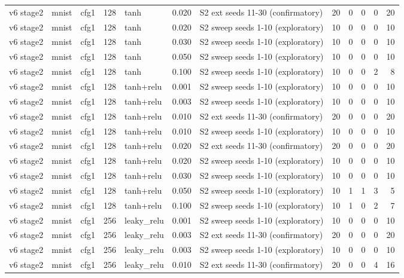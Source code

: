 \begin{table}[htbp]
{\begin{tabular}{@{}lllrlrlrrrrr@{}}
v6 stage2 & mnist & cfg1 & 128 & tanh & 0.020 & S2 ext seeds 11-30 (confirmatory) & 20 & 0 & 0 & 0 & 20 \\
v6 stage2 & mnist & cfg1 & 128 & tanh & 0.020 & S2 sweep seeds 1-10 (exploratory) & 10 & 0 & 0 & 0 & 10 \\
v6 stage2 & mnist & cfg1 & 128 & tanh & 0.030 & S2 sweep seeds 1-10 (exploratory) & 10 & 0 & 0 & 0 & 10 \\
v6 stage2 & mnist & cfg1 & 128 & tanh & 0.050 & S2 sweep seeds 1-10 (exploratory) & 10 & 0 & 0 & 0 & 10 \\
v6 stage2 & mnist & cfg1 & 128 & tanh & 0.100 & S2 sweep seeds 1-10 (exploratory) & 10 & 0 & 0 & 2 & 8 \\
v6 stage2 & mnist & cfg1 & 128 & tanh+relu & 0.001 & S2 sweep seeds 1-10 (exploratory) & 10 & 0 & 0 & 0 & 10 \\
v6 stage2 & mnist & cfg1 & 128 & tanh+relu & 0.003 & S2 sweep seeds 1-10 (exploratory) & 10 & 0 & 0 & 0 & 10 \\
v6 stage2 & mnist & cfg1 & 128 & tanh+relu & 0.010 & S2 ext seeds 11-30 (confirmatory) & 20 & 0 & 0 & 0 & 20 \\
v6 stage2 & mnist & cfg1 & 128 & tanh+relu & 0.010 & S2 sweep seeds 1-10 (exploratory) & 10 & 0 & 0 & 0 & 10 \\
v6 stage2 & mnist & cfg1 & 128 & tanh+relu & 0.020 & S2 ext seeds 11-30 (confirmatory) & 20 & 0 & 0 & 0 & 20 \\
v6 stage2 & mnist & cfg1 & 128 & tanh+relu & 0.020 & S2 sweep seeds 1-10 (exploratory) & 10 & 0 & 0 & 0 & 10 \\
v6 stage2 & mnist & cfg1 & 128 & tanh+relu & 0.030 & S2 sweep seeds 1-10 (exploratory) & 10 & 0 & 0 & 0 & 10 \\
v6 stage2 & mnist & cfg1 & 128 & tanh+relu & 0.050 & S2 sweep seeds 1-10 (exploratory) & 10 & 1 & 1 & 3 & 5 \\
v6 stage2 & mnist & cfg1 & 128 & tanh+relu & 0.100 & S2 sweep seeds 1-10 (exploratory) & 10 & 1 & 0 & 2 & 7 \\
v6 stage2 & mnist & cfg1 & 256 & leaky\_relu & 0.001 & S2 sweep seeds 1-10 (exploratory) & 10 & 0 & 0 & 0 & 10 \\
v6 stage2 & mnist & cfg1 & 256 & leaky\_relu & 0.003 & S2 ext seeds 11-30 (confirmatory) & 20 & 0 & 0 & 0 & 20 \\
v6 stage2 & mnist & cfg1 & 256 & leaky\_relu & 0.003 & S2 sweep seeds 1-10 (exploratory) & 10 & 0 & 0 & 0 & 10 \\
v6 stage2 & mnist & cfg1 & 256 & leaky\_relu & 0.010 & S2 ext seeds 11-30 (confirmatory) & 20 & 0 & 0 & 4 & 16 \\

\end{tabular}}
\end{table}
